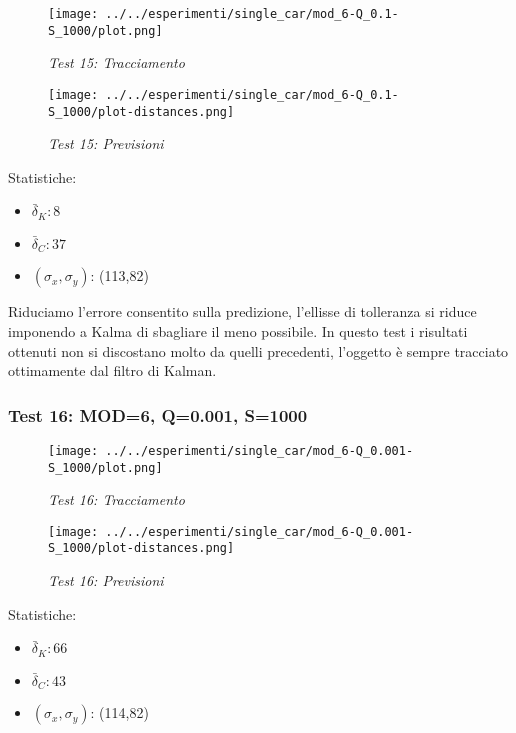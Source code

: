 \begin{figure}[hb]
\centering
\texttt{[image: ../../esperimenti/single\_car/mod\_6-Q\_0.1-S\_1000/plot.png]}
\caption{\textit{Test 15: Tracciamento}}
\end{figure}

\begin{figure}[hb]
\centering
\texttt{[image: ../../esperimenti/single\_car/mod\_6-Q\_0.1-S\_1000/plot-distances.png]}
\caption{\textit{Test 15: Previsioni}}
\end{figure}

Statistiche:
\begin{itemize}
\item \begin{math} \bar \delta_K: 8 \end{math}
\item \begin{math} \bar \delta_C: 37 \end{math}
\item \begin{math}(\sigma_x,\sigma_y)\end{math}: (113,82)
\end{itemize}

Riduciamo l'errore consentito sulla predizione, l'ellisse di tolleranza si riduce imponendo a Kalma di sbagliare il meno possibile. In questo test i risultati ottenuti non si discostano molto da quelli precedenti, l'oggetto è sempre tracciato ottimamente dal filtro di Kalman.

\newpage
\subsubsection{Test 16: MOD=6, Q=0.001, S=1000}

\begin{figure}[hb]
\centering
\texttt{[image: ../../esperimenti/single\_car/mod\_6-Q\_0.001-S\_1000/plot.png]}
\caption{\textit{Test 16: Tracciamento}}
\end{figure}

\begin{figure}[hb]
\centering
\texttt{[image: ../../esperimenti/single\_car/mod\_6-Q\_0.001-S\_1000/plot-distances.png]}
\caption{\textit{Test 16: Previsioni}}
\end{figure}

Statistiche:
\begin{itemize}
\item \begin{math} \bar \delta_K: 66 \end{math}
\item \begin{math} \bar \delta_C: 43 \end{math}
\item \begin{math}(\sigma_x,\sigma_y)\end{math}: (114,82)
\end{itemize}

